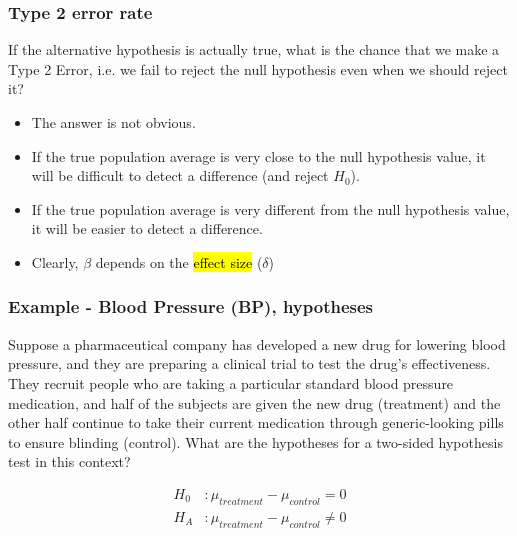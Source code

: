 \documentclass[slidestop,compress,mathserif]{beamer}
\newcommand{\soln}[1]{\textit{#1}}
\begin{document}
\begin{frame}
\frametitle{Type 2 error rate}

If the alternative hypothesis is actually true, what is the chance that we make a Type 2 Error, i.e. we fail to reject the null hypothesis even when we should reject it?

\begin{itemize}

\item The answer is not obvious.

\item If the true population average is very close to the null hypothesis value, it will be difficult to detect a difference (and reject $H_0$).

\item If the true population average is very different from the null hypothesis value, it will be easier to detect a difference.

\item Clearly, $\beta$ depends on the \hl{effect size} ($\delta$)
\end{itemize}

\end{frame}


\begin{frame}
\frametitle{Example - Blood Pressure (BP), hypotheses}

{\dq
{\footnotesize
Suppose a pharmaceutical company has developed a new drug for lowering blood pressure, and they are preparing a clinical trial to test the drug's effectiveness. They recruit people who are taking a particular standard blood pressure medication, and half of the subjects are given the new drug (treatment) and the other half continue to take their current medication through generic-looking pills to ensure blinding (control). What are the hypotheses for a two-sided hypothesis test in this context?
}
}

\pause

\soln{
\begin{align*}
H_0&: \mu_{treatment} - \mu_{control} = 0 \\
H_A&: \mu_{treatment} - \mu_{control} \ne 0  
\end{align*}
}

\end{frame}

\end{document}
